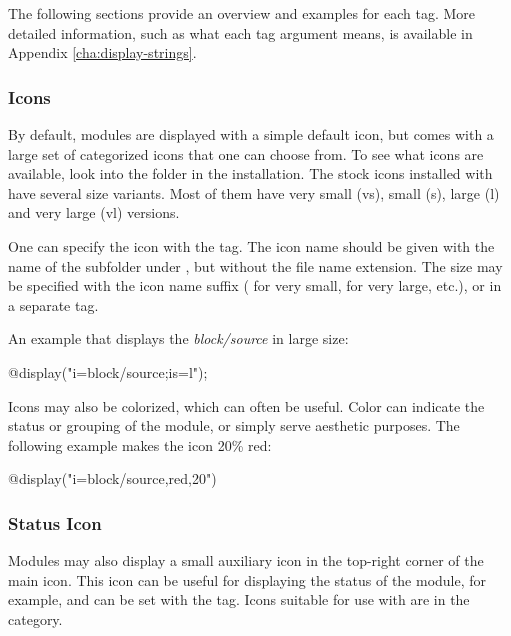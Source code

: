 The following sections provide an overview and examples for each tag. More
detailed information, such as what each tag argument means, is available in
Appendix \ref{cha:display-strings}.

\subsubsection{Icons}
\label{sec:graphics:submodule-icons}

By default, modules are displayed with a simple default icon, but {\opp}
comes with a large set of categorized icons that one can choose from.
To see what icons are available, look into the  folder
in the {\opp} installation. The stock icons installed with {\opp} have
several size variants. Most of them have very small (vs), small (s),
large (l) and very large (vl) versions.

One can specify the icon with the  tag. The icon name should be
given with the name of the subfolder under , but without the
file name extension. The size may be specified with the icon name suffix
( for very small,  for very large, etc.), or
in a separate  tag.

An example that displays the \textit{block/source} in large size:

\begin{ned}
@display("i=block/source;is=l");
\end{ned}

Icons may also be colorized, which can often be useful. Color can indicate
the status or grouping of the module, or simply serve aesthetic purposes.
The following example makes the icon 20\% red:

\begin{ned}
@display("i=block/source,red,20")
\end{ned}

\begin{center}
\end{center}

\subsubsection{Status Icon}
\label{sec:graphics:submodule-status-icon}

Modules may also display a small auxiliary icon in the top-right corner of
the main icon. This icon can be useful for displaying the status of the
module, for example, and can be set with the  tag. Icons suitable
for use with  are in the  category.

